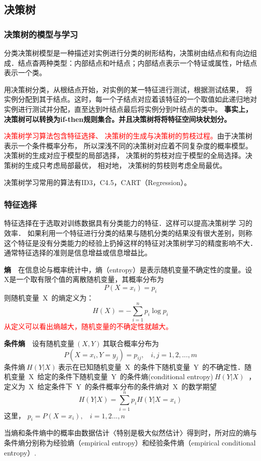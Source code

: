 \newpage
\subsection{决策树}
\subsubsection{决策树的模型与学习}
分类决策树模型是一种描述对实例进行分类的树形结构，决策树由结点和有向边组成．结点杳两种类型：内部结点和叶结点；内部结点表示一个特证或属性，叶结点表示一个类。

用决策树分类，从根结点开始，对实例的某一特征进行测试，根据测试结果， 将实例分配到其于结点。这时，每一个子结点对应着该特征的一个取值如此递归地对实例进行测试并分配，直至达到叶结点最后将实例分到叶结点的类中。
\textbf{事实上，决策树可以转换为if-then规则集合。并且决策树将将特征空间块状划分。}

\textcolor{red}{决策树学习算法包含特征选择、 决策树的生成与决策树的剪枝过程。}由于决策树表示一个条件概率分布， 所以深浅不同的决策树对应着不同复杂度的概率模型。决策树的生成对应于模型的局部选择， 决策树的剪枝对应于模型的全局选择。决策树的生成只考虑局部最优， 相对地， 决策树的剪枝则考虑全局最优。

决策树学习常用的算法有ID3，C4.5，CART（Regression）。
\subsubsection{特征选择}
特征选择在于选取对训练数据具有分类能力的特征．这样可以提高决策树学 习的效率． 如果利用一个特征进行分类的结果与随机分类的结果没有很大差别，则称这个特征是没有分类能力的经验上扔掉这样的特征对决策树学习的精度影响不大． 通常特征选择的准则是信息增益或信息增益比。

\textbf{熵}~~在信息论与概率统计中，熵（entropy）是表示随机变量不确定性的度量。设X是一个取有限个值的离散随机变量，其概率分布为$$P(X=x_i)=p_i$$
则随机变量~X~的熵定义为：$$H(X)=-\sum_{i=1}^{n}p_i\log p_i$$
\textcolor{red}{从定义可以看出熵越大，随机变量的不确定性就越大。}

\textbf{条件熵}~~设有随机变量$~(X,Y)~$其联合概率分布为$$P(X=x_i,Y=y_j)=p_{ij},~~~~i,j=1,2,...,m$$
条件熵$~H(Y|X)~$表示在已知随机变量~X~的条件下随机变量~Y~的不确定性．随机变量~X~给定的条件下随机变量~Y~的条件熵(conditional entropy)$~H(Y|X)~$ ， 定义为~X~给定条件下~Y~的条件概率分布的条件熵对~X~的数学期望$$H(Y|X)=\sum_{i=1}^{n}p_iH(Y|X=x_i)$$
这里， $p_i = P(X=x_i),~~~~i=1,2...,n$

当熵和条件熵中的概率由数据估计〈特别是极大似然估计〉得到时，所对应的熵与条件熵分别称为经验熵（empirical entropy）和经验条件熵（empirical conditional entropy）.

